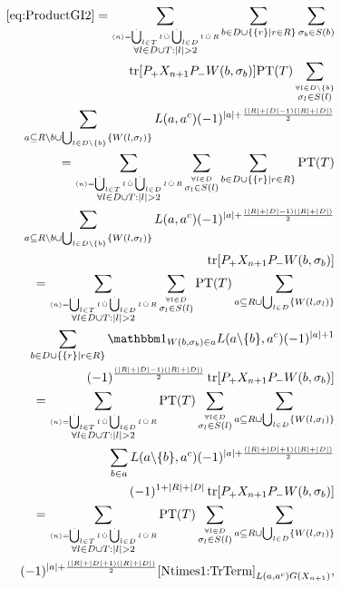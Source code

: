 \documentclass[b5paper,draft,openbib,12pt]{memoir}
\DeclareMathOperator{\tr}{tr}
\DeclareMathOperator{\dotCup}{\mathop{\dot{\bigcup}}}
\DeclareMathOperator{\dotcup}{\mathop{\dot{\cup}}}
\newcommand{\id}{{\mathbbm 1}}
\begin{document}
\begin{align}\notag
\eqref{eq:ProductGI2}= \sum_{\stackrel{\langle n \rangle = \dotCup_{l\in T}l \dotcup \dotCup_{l\in D} l \dotcup R}{\forall l \in D \cup T: |l|>2} }\sum_{b \in D \cup \{ \{r\} \mid r\in R \}}  \sum_{\sigma_b \in S(b)}\\\notag
 \tr[P_+ X_{n+1} P_- W(b,\sigma_b)] \text{PT}(T) \sum_{\stackrel{\forall l \in D\backslash \{b\}}{\sigma_l \in S(l)}} \\\notag
 \sum_{a\subseteq R\backslash b \cup \bigcup_{l\in D\backslash \{b\}}\{W(l,\sigma_l)\}}  L(a,a^c) (-1)^{|a|+ \frac{(|R|+|D|-1)(|R|+|D|)}{2}}\\\notag
 =\sum_{\stackrel{\langle n \rangle = \dotCup_{l\in T}l \dotcup \dotCup_{l\in D} l \dotcup R}{\forall l \in D \cup T: |l|>2} }\sum_{\stackrel{\forall l \in D}{\sigma_l \in S(l)}}  \sum_{b \in D \cup \{ \{r\} \mid r\in R \}} \text{PT}(T)\\\notag
 \sum_{a\subseteq R\backslash b \cup \bigcup_{l\in D\backslash \{b\}}\{W(l,\sigma_l)\}}  L(a,a^c) (-1)^{|a|+ \frac{(|R|+|D|-1)(|R|+|D|)}{2}}\\\notag
\tr[P_+ X_{n+1} P_- W(b,\sigma_b)]   \\\notag
=\sum_{\stackrel{\langle n \rangle = \dotCup_{l\in T}l \dotcup \dotCup_{l\in D} l \dotcup R}{\forall l \in D \cup T: |l|>2} }\sum_{\stackrel{\forall l \in D}{\sigma_l \in S(l)}}   \text{PT}(T)  \sum_{a\subseteq R \cup \bigcup_{l\in D}\{W(l,\sigma_l)\}}\\\notag
\sum_{b \in D \cup \{ \{r\} \mid r\in R \}} \id_{W(b,\sigma_b)\in a}  L(a\backslash\{b\},a^c) (-1)^{|a|+1}\\\notag
(-1)^\frac{(|R|+|D|-1)(|R|+|D|)}{2} \tr[P_+ X_{n+1} P_- W(b,\sigma_b)]\\\notag
=\sum_{\stackrel{\langle n \rangle = \dotCup_{l\in T}l \dotcup \dotCup_{l\in D} l \dotcup R}{\forall l \in D \cup T: |l|>2} }\text{PT}(T) \sum_{\stackrel{\forall l \in D}{\sigma_l \in S(l)}}  \sum_{a\subseteq R \cup \bigcup_{l\in D}\{W(l,\sigma_l)\}} \\\notag
 \sum_{b \in a  }   L(a\backslash\{b\},a^c) (-1)^{|a|+\frac{(|R|+|D|+1)(|R|+|D|)}{2}}\\\notag
 (-1)^{1+|R|+|D|} \tr[P_+ X_{n+1} P_- W(b,\sigma_b)]\\\notag
 =\sum_{\stackrel{\langle n \rangle = \dotCup_{l\in T}l \dotcup \dotCup_{l\in D} l \dotcup R}{\forall l \in D \cup T: |l|>2} }\text{PT}(T) \sum_{\stackrel{\forall l \in D}{\sigma_l \in S(l)}}  \sum_{a\subseteq R \cup \bigcup_{l\in D}\{W(l,\sigma_l)\}} \\
   (-1)^{|a|+\frac{(|R|+|D|+1)(|R|+|D|)}{2}}  \eqref{Ntimes1:TrTerm}_{L(a,a^c) G(X_{n+1})},
\end{align}
\end{document}
